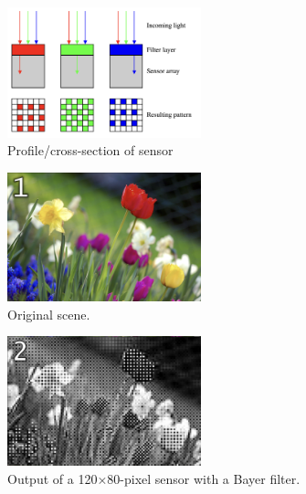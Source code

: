 \documentclass{loyola-beamer}
\begin{document}
\begin{frame}
	\begin{figure}
		\begin{center}
			\includegraphics[width=0.5\textwidth]{./figures/Bayer_pattern_on_sensor.png}
		\end{center}
		\caption{Profile/cross-section of sensor}
	\end{figure}
\end{frame}

\begin{frame}
	\begin{figure}
		\begin{center}
			\includegraphics[width=0.5\textwidth]{./figures/bayer-1.png}
		\end{center}
		\caption{Original scene.}
	\end{figure}
\end{frame}

\begin{frame}
	\begin{figure}
		\begin{center}
			\includegraphics[width=0.5\textwidth]{./figures/bayer-2.png}
		\end{center}
		\caption{Output of a 120×80-pixel sensor with a Bayer filter.}
	\end{figure}
\end{frame}
\end{document}
